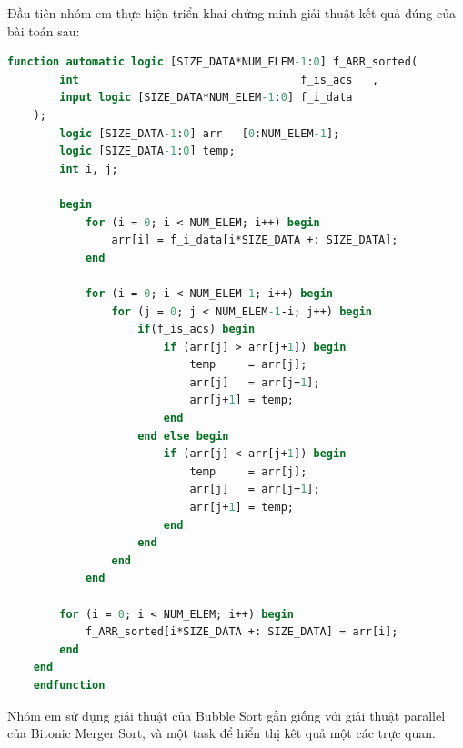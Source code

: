








Đầu tiên nhóm em thực hiện triển khai chứng minh giải thuật kết quả đúng của bài toán sau:

\begin{lstlisting}[style=StyleCode, language=SystemVerilog, caption={Giải thuật chứng minh bộ Bitonic Merger Sort 8 phần tử.}]
	function automatic logic [SIZE_DATA*NUM_ELEM-1:0] f_ARR_sorted(
		int                                  f_is_acs   ,
		input logic [SIZE_DATA*NUM_ELEM-1:0] f_i_data
	);
		logic [SIZE_DATA-1:0] arr   [0:NUM_ELEM-1];
		logic [SIZE_DATA-1:0] temp;
		int i, j;
	
		begin
			for (i = 0; i < NUM_ELEM; i++) begin
				arr[i] = f_i_data[i*SIZE_DATA +: SIZE_DATA];
			end
			
			for (i = 0; i < NUM_ELEM-1; i++) begin
				for (j = 0; j < NUM_ELEM-1-i; j++) begin
					if(f_is_acs) begin
						if (arr[j] > arr[j+1]) begin
							temp     = arr[j];
							arr[j]   = arr[j+1];
							arr[j+1] = temp;
						end 
					end else begin
						if (arr[j] < arr[j+1]) begin
							temp     = arr[j];
							arr[j]   = arr[j+1];
							arr[j+1] = temp;
						end
					end
				end
			end
	
		for (i = 0; i < NUM_ELEM; i++) begin
			f_ARR_sorted[i*SIZE_DATA +: SIZE_DATA] = arr[i];
		end
	end
	endfunction
\end{lstlisting}

Nhóm em sử dụng giải thuật của Bubble Sort gần giống với giải thuật parallel của Bitonic Merger Sort, và một task để hiển thị kêt quả một các trực quan.

